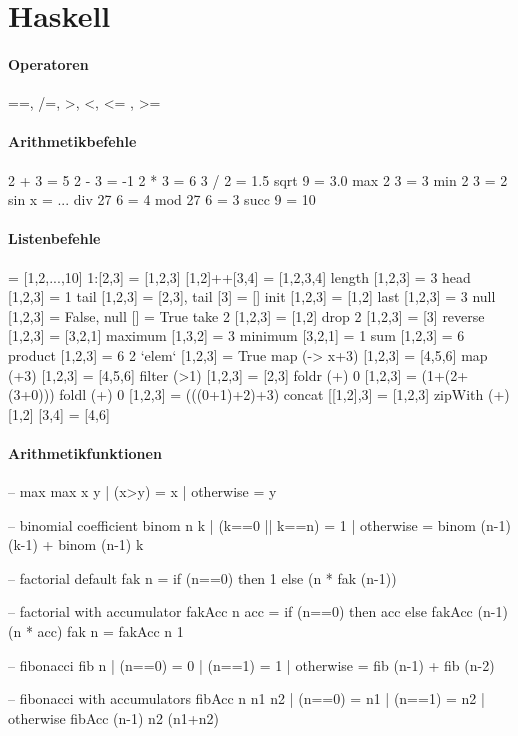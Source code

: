\section{Haskell}

\paragraph{Operatoren}
\begin{haskell}
  ==, /=, >, <, <= , >=
\end{haskell}

\paragraph{Arithmetikbefehle}
\begin{haskell}
  2 + 3 = 5
  2 - 3 = -1
  2 * 3 = 6
  3 / 2 = 1.5
  sqrt 9 = 3.0
  max 2 3 = 3
  min 2 3 = 2
  sin x = ...
  div 27 6 = 4
  mod 27 6 = 3
  succ 9 = 10
\end{haskell}

\paragraph{Listenbefehle}
\begin{haskell}
  [1..10] = [1,2,...,10]
  1:[2,3] = [1,2,3]
  [1,2]++[3,4] = [1,2,3,4]
  length [1,2,3] = 3
  head [1,2,3] = 1
  tail [1,2,3] = [2,3], tail [3] = []
  init [1,2,3] = [1,2]
  last [1,2,3] = 3
  null [1,2,3] = False, null [] = True
  take 2 [1,2,3] = [1,2]
  drop 2 [1,2,3] = [3]
  reverse [1,2,3] = [3,2,1]
  maximum [1,3,2] = 3
  minimum [3,2,1] = 1
  sum [1,2,3] = 6
  product [1,2,3] = 6
  2 `elem` [1,2,3] = True 
  map (\x -> x+3) [1,2,3] = [4,5,6]
  map (+3) [1,2,3] = [4,5,6]
  filter (>1) [1,2,3] = [2,3]
  foldr (+) 0 [1,2,3] = (1+(2+(3+0)))
  foldl (+) 0 [1,2,3] = (((0+1)+2)+3)
  concat [[1,2],3] = [1,2,3]
  zipWith (+) [1,2] [3,4] = [4,6]
\end{haskell}

\paragraph{Arithmetikfunktionen}
\begin{haskell}
  -- max
  max x y
    | (x>y) = x
    | otherwise = y

  -- binomial coefficient
  binom n k
    | (k==0 || k==n) = 1
    | otherwise = binom (n-1) (k-1) + binom (n-1) k

  -- factorial default
  fak n = if (n==0) then 1 else (n * fak (n-1))

  -- factorial with accumulator
  fakAcc n acc = if (n==0) then acc else fakAcc (n-1) (n * acc)
  fak n = fakAcc n 1

  -- fibonacci
  fib n
    | (n==0) = 0
    | (n==1) = 1
    | otherwise = fib (n-1) + fib (n-2)

  -- fibonacci with accumulators
  fibAcc n n1 n2
    | (n==0) = n1
    | (n==1) = n2
    | otherwise fibAcc (n-1) n2 (n1+n2)
\end{haskell}

